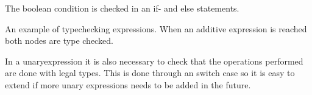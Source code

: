 The boolean condition is checked in an if- and else statements.
 \begin{figure}[H]
\centering
{}
\caption{}
\label{lf05}
\end{figure}

An example of typechecking expressions. When an additive expression is reached both nodes are type checked.
\begin{figure}[H]
\centering
{}
\caption{}
\label{lf05}
\end{figure}

In a unaryexpression it is also necessary to check that the operations performed are done with legal types. This is done through an switch case so it is easy to extend if more unary expressions needs to be added in the future. 
\begin{figure}[H]
\centering
{}
\caption{}
\label{lf05}
\end{figure}

